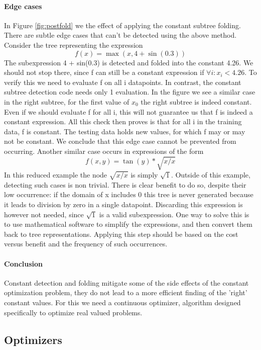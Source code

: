 \paragraph{Edge cases}
In Figure \ref{fig:postfold} we the effect of applying the constant subtree folding. 
There are subtle edge cases that can't be detected using the above method. Consider the tree representing the expression
\[
f(x) = \max(x, 4 + \sin(0.3)) 
\]
The subexpression 4 + sin(0.3) is detected and folded into the constant 4.26. 
We should not stop there, since f can still be a constant expression if $\forall i :  x_i < 4.26$. To verify this we need to evaluate f on all i datapoints. In contrast, the constant subtree detection code needs only 1 evaluation. In the figure we see a similar case in the right subtree, for the first value of $x_0$ the right subtree is indeed constant. 
Even if we should evaluate f for all i, this will not guarantee us that f is indeed a constant expression. All this check then proves is that for all i in the training data, f is constant. The testing data holds new values, for which f may or may not be constant. We conclude that this edge case cannot be prevented from occurring.
Another similar case occurs in expressions of the form 
\[
f(x, y) = \tan(y) * \sqrt{x/x}
\]
In this reduced example the node $\sqrt{x/x}$ is simply $\sqrt{1}$. Outside of this example, detecting such cases is non trivial. There is clear benefit to do so, despite their low occurrence: if the domain of x includes 0 this tree is never generated because it leads to division by zero in a single datapoint. Discarding this expression is however not needed, since $\sqrt{1}$ is a valid subexpression. One way to solve this is to use mathematical software to simplify the expressions, and then convert them back to tree representations. Applying this step should be based on the cost versus benefit and the frequency of such occurrences. 

\paragraph{Conclusion}
Constant detection and folding mitigate some of the side effects of the constant optimization problem, they do not lead to a more efficient finding of the 'right' constant values. For this we need a continuous optimizer, algorithm designed specifically to optimize real valued problems.

\subsection{Optimizers}

